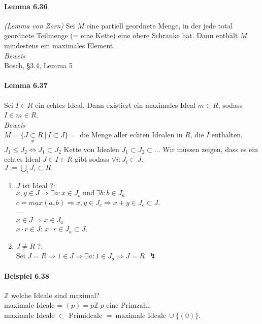 \documentclass{scrartcl}
\begin{document}
\paragraph{Lemma 6.36}
\textit{(Lemma von Zorn)} Sei $M$ eine partiell geordnete Menge, in der jede
total geordnete Teilmenge (= eine Kette) eine obere Schranke hat.
Dann enthält $M$ mindestens ein maximales Element. \\
\textit{Beweis} \\
Bosch, §3.4, Lemma 5

\paragraph{Lemma 6.37}
Sei $I \in R$ ein echtes Ideal. Dann existiert ein maximales Ideal $m \in R$,
sodass $I \in m \in R$. \\
\textit{Beweis} \\
$M = \{J \underset{\neq}{\subset} R ~|~ I \subset J \} = $ die Menge aller echten
Idealen in $R$, die $I$ enthalten, $J_1 \leq J_2 \Leftrightarrow J_1 \subset
J_2$ Kette von Idealen $J_1 \subset J_2 \subset \dots$ Wir müssen zeigen, dass
es ein echtes Ideal $J \in I \in R$ gibt sodass $\forall i : J_i \subset J$. \\
$J := \bigcup_i J_i \subset R$
\begin{enumerate}
\item $J$ ist Ideal ?: \\
  $x,y \in J \Rightarrow \exists a: x \in J_a ~\text{und}~ \exists b: b \in J_b$ \\
  $c = max(a,b) \Rightarrow x,y \in J_c \Rightarrow x + y \in J_c \subset J$. \\
  --- \\
  $x \in J \Rightarrow x \in J_a$ \\
  $x \cdot r \in J$: $x \cdot r \in J_a \subset J$.
\item $J \neq R$ ?: \\
  Sei $J = R \Rightarrow 1 \in J \Rightarrow \exists a: 1 \in J_a \Rightarrow J
  = R ~~\lightning$
\end{enumerate}

\paragraph{Beispiel 6.38} $\mathbb{Z}$ welche Ideale sind maximal? \\
maximale Ideale = $(p) = p \mathbb{Z} ~p$ eine Primzahl. \\
maximale Ideale $\subset$ Primideale $= ~\text{maximale Ideale}~ \cup \{(0)\}$.
\end{document}
